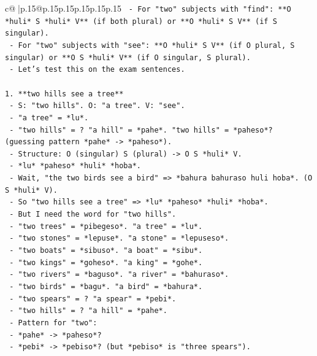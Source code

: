 \documentclass{article}
\begin{document}
{\begin{supertabular}{c@{$\;$}|p{.15\linewidth}@{}p{.15\linewidth}p{.15\linewidth}p{.15\linewidth}p{.15\linewidth}p{.15\linewidth}}
{{{\texttt{                {-}   For "two" subjects with "find": **O *huli* S *huli* V** (if both plural) or **O *huli* S V** (if S singular).} \\
\texttt{                {-}   For "two" subjects with "see": **O *huli* S V** (if O plural, S singular) or **O S *huli* V** (if O singular, S plural).} \\
\texttt{            {-}   Let's test this on the exam sentences.} \\
\\ 
\texttt{1.  **two hills see a tree**} \\
\texttt{    {-}   S: "two hills". O: "a tree". V: "see".} \\
\texttt{    {-}   "a tree" = *lu*.} \\
\texttt{    {-}   "two hills" = ? "a hill" = *pahe*. "two hills" = *paheso*? (guessing pattern *pahe* {-}> *paheso*).} \\
\texttt{    {-}   Structure: O (singular) S (plural) {-}> O S *huli* V.} \\
\texttt{    {-}   *lu* *paheso* *huli* *hoba*.} \\
\texttt{    {-}   Wait, "the two birds see a bird" => *bahura bahuraso huli hoba*. (O S *huli* V).} \\
\texttt{    {-}   So "two hills see a tree" => *lu* *paheso* *huli* *hoba*.} \\
\texttt{    {-}   But I need the word for "two hills".} \\
\texttt{    {-}   "two trees" = *pibegeso*. "a tree" = *lu*.} \\
\texttt{    {-}   "two stones" = *lepuse*. "a stone" = *lepuseso*.} \\
\texttt{    {-}   "two boats" = *sibuso*. "a boat" = *sibu*.} \\
\texttt{    {-}   "two kings" = *goheso*. "a king" = *gohe*.} \\
\texttt{    {-}   "two rivers" = *baguso*. "a river" = *bahuraso*.} \\
\texttt{    {-}   "two birds" = *bagu*. "a bird" = *bahura*.} \\
\texttt{    {-}   "two spears" = ? "a spear" = *pebi*.} \\
\texttt{    {-}   "two hills" = ? "a hill" = *pahe*.} \\
\texttt{    {-}   Pattern for "two":} \\
\texttt{        {-}   *pahe* {-}> *paheso*?} \\
\texttt{        {-}   *pebi* {-}> *pebiso*? (but *pebiso* is "three spears").} \\
}}}
\end{supertabular}}
\end{document}
